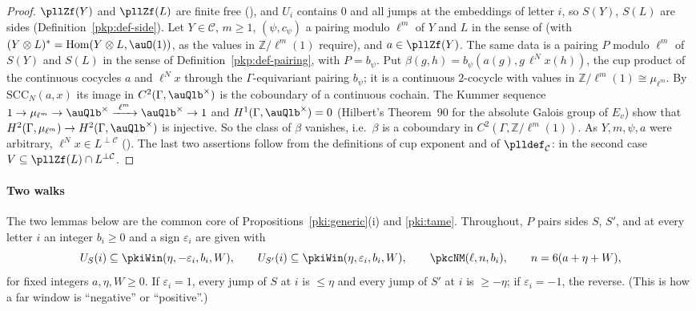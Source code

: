\documentclass[10pt]{amsart}
\theoremstyle{definition}
\theoremstyle{remark}
\newcommand{\Z}{\mathbb Z}
\begin{document}
\begin{proof}
$\pllZf(Y)$ and $\pllZf(L)$ are finite free ({\cite[Lemma~5.6]{P55}}), and $U_i$ contains $0$ and all
jumps at the embeddings of letter $i$, so $S(Y)$, $S(L)$ are sides (Definition~\ref{pkp:def-side}).
Let $Y\in\mathcal C$, $m\ge1$, $(\psi,c_\psi)$ a pairing modulo $\ell^m$ of $Y$ and $L$ in the sense of
{\cite[Definition~5.1(4)]{P55}} (with $(Y\otimes L)^*=\operatorname{Hom}(Y\otimes L,\auO(1))$, as the
values in $\Z/\ell^m(1)$ require), and $a\in\pllZf(Y)$. The same data is a pairing $P$ modulo $\ell^m$
of $S(Y)$ and $S(L)$ in the sense of Definition~\ref{pkp:def-pairing}, with $P=b_\psi$. Put
$\beta(g,h)=b_\psi(a(g),g\,\ell^Nx(h))$, the cup product of the continuous cocycles $a$ and $\ell^Nx$
through the $\Gamma$-equivariant pairing $b_\psi$; it is a continuous $2$-cocycle with values in
$\Z/\ell^m(1)\cong\mu_{\ell^m}$. By $\mathrm{SCC}_N(a,x)$ its image in $C^2(\Gamma,\auQlb^\times)$ is the
coboundary of a continuous cochain. The Kummer sequence $1\to\mu_{\ell^m}\to\auQlb^\times
\xrightarrow{\ \ell^m\ }\auQlb^\times\to1$ and $H^1(\Gamma,\auQlb^\times)=0$ (Hilbert's Theorem~90 for
the absolute Galois group of $E_v$) show that $H^2(\Gamma,\mu_{\ell^m})\to H^2(\Gamma,\auQlb^\times)$ is
injective. So the class of $\beta$ vanishes, i.e.\ $\beta$ is a coboundary in $C^2(\Gamma,
\Z/\ell^m(1))$. As $Y,m,\psi,a$ were arbitrary, $\ell^Nx\in L^{\perp\mathcal C}$ ({\cite[Definition~5.1(5)]{P55}}).
The last two assertions follow from the definitions of cup exponent and of $\plldef_{\mathcal C}$:
in the second case $V\subseteq\pllZf(L)\cap L^{\perp\mathcal C}$.
\end{proof}

\paragraph*{Two walks}

The two lemmas below are the common core of Propositions~\ref{pki:generic}(i) and \ref{pki:tame}.
Throughout, $P$ pairs sides $S$, $S'$, and at every letter $i$ an integer $b_i\ge0$ and a sign
$\varepsilon_i$ are given with
\begin{equation}\label{pkc:eq-win}
U_S(i)\subseteq\pkiWin(\eta,-\varepsilon_i,b_i,W),\qquad U_{S'}(i)\subseteq\pkiWin(\eta,\varepsilon_i,
b_i,W),\qquad \pkcNM(\ell,n,b_i),\qquad n=6(a+\eta+W),
\end{equation}
for fixed integers $a,\eta,W\ge0$. If $\varepsilon_i=1$, every jump of $S$ at $i$ is $\le\eta$ and
every jump of $S'$ at $i$ is $\ge-\eta$; if $\varepsilon_i=-1$, the reverse. (This is how a far
window is ``negative'' or ``positive''.)
\end{document}
